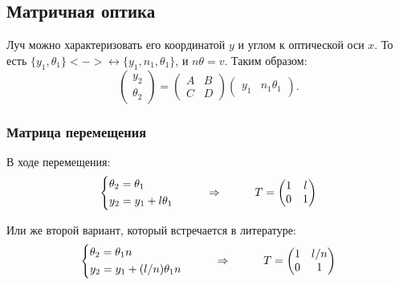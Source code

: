 \subsection*{Матричная оптика}

Луч можно характеризовать его координатой $y$ и углом к оптической оси $x$. То есть $\{ y_1, \theta_1\} <->\leftrightarrow \{y_1, n_1, \theta_1\}$, и $n \theta = v$. Таким образом:
\begin{equation*}
	\begin{pmatrix}
		y_2 \\ \theta_2
	\end{pmatrix}
	=
	\begin{pmatrix}
		A & B \\ C & D
	\end{pmatrix}
	\begin{pmatrix}
		y_1 & n_1 \theta_1
	\end{pmatrix}.
\end{equation*}

\subsubsection*{Матрица перемещения}
В ходе перемещения:
\begin{equation*}
	\left\{
	\begin{aligned}
		&\theta_2 = \theta_1\\
		&y_2 = y_1 + l \theta_1
	\end{aligned}
	\right.
	\hspace{1 cm}
	\Rightarrow
	\hspace{1 cm}
	T = \begin{pmatrix}
		1 & l \\
		0 & 1
	\end{pmatrix}
\end{equation*}

Или же второй вариант,  который встречается в литературе:
\begin{equation*}
	\left\{
	\begin{aligned}
		&\theta_2 = \theta_1 n \\
		&y_2 = y_1 + (l/n) \theta_1 n
	\end{aligned}
	\right.
	\hspace{1 cm}
	\Rightarrow
	\hspace{1 cm}
	T = \begin{pmatrix}
		1 & l/n \\
		0 & 1
	\end{pmatrix}
\end{equation*}

